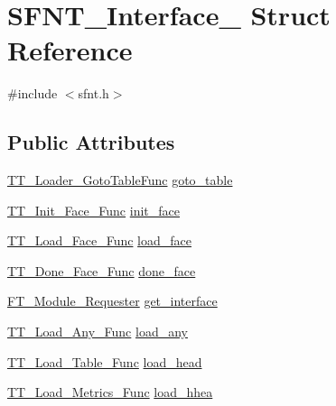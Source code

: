 \hypertarget{struct_s_f_n_t___interface__}{\section{S\-F\-N\-T\-\_\-\-Interface\-\_\- Struct Reference}
\label{struct_s_f_n_t___interface__}
}


{\ttfamily \#include $<$sfnt.\-h$>$}

\subsection*{Public Attributes}
\begin{DoxyCompactItemize}
\item 
\hyperlink{tttypes_8h_a89519914215a0605b354d0b20e32b1e3}{T\-T\-\_\-\-Loader\-\_\-\-Goto\-Table\-Func} \hyperlink{struct_s_f_n_t___interface___aee5cacbd128dd48ddf73ab6eb8d89500}{goto\-\_\-table}
\item 
\hyperlink{sfnt_8h_a3c50e6b05a411e9bd1ceeea49c23b67d}{T\-T\-\_\-\-Init\-\_\-\-Face\-\_\-\-Func} \hyperlink{struct_s_f_n_t___interface___a9ec559df25a7bd65db0c1c4df8554321}{init\-\_\-face}
\item 
\hyperlink{sfnt_8h_a0450d495be2bb5998ffd88413bad376c}{T\-T\-\_\-\-Load\-\_\-\-Face\-\_\-\-Func} \hyperlink{struct_s_f_n_t___interface___ad87a982ddabe05f0d15330aec54f7597}{load\-\_\-face}
\item 
\hyperlink{sfnt_8h_a1c6bb13564467ee23f2b2880eab5222b}{T\-T\-\_\-\-Done\-\_\-\-Face\-\_\-\-Func} \hyperlink{struct_s_f_n_t___interface___a4066721e7bb91b28819b5e673fa406bb}{done\-\_\-face}
\item 
\hyperlink{ftmodapi_8h_a7862753074f0f521aaedd68a26a08a1f}{F\-T\-\_\-\-Module\-\_\-\-Requester} \hyperlink{struct_s_f_n_t___interface___a417552cced1058aeba30fd485fd838e2}{get\-\_\-interface}
\item 
\hyperlink{sfnt_8h_a41cb5d6cb9ca6b6ab80e1e7a4809ab6d}{T\-T\-\_\-\-Load\-\_\-\-Any\-\_\-\-Func} \hyperlink{struct_s_f_n_t___interface___a9497a7c23efc4a27124b72f794167f33}{load\-\_\-any}
\item 
\hyperlink{sfnt_8h_a91c8b8234760c9e3208e37c15cf1663c}{T\-T\-\_\-\-Load\-\_\-\-Table\-\_\-\-Func} \hyperlink{struct_s_f_n_t___interface___af4e699f29f305ac50a3e35abda888936}{load\-\_\-head}
\item 
\hyperlink{sfnt_8h_aa7af5d423da421bd08dd11fe4c5bfc6c}{T\-T\-\_\-\-Load\-\_\-\-Metrics\-\_\-\-Func} \hyperlink{struct_s_f_n_t___interface___a8e24e72f3a69f8c4415a1f9e433da08f}{load\-\_\-hhea}

\end{DoxyCompactItemize}
